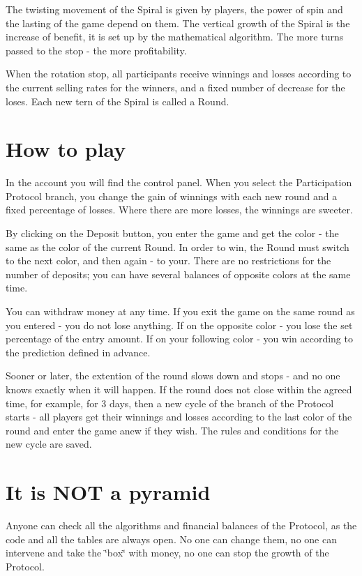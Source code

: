 

The twisting movement of the Spiral is given by players, the power of spin and the lasting of the game depend on them. The vertical growth of the Spiral is the increase of benefit, it is set up by the mathematical algorithm. The more turns passed to the stop -\/ the more profitability.

When the rotation stop, all participants receive winnings and losses according to the current selling rates for the winners, and a fixed number of decrease for the loses. Each new tern of the Spiral is called a Round.

 

\section*{How to play}

In the account you will find the control panel. When you select the Participation Protocol branch, you change the gain of winnings with each new round and a fixed percentage of losses. Where there are more losses, the winnings are sweeter.

By clicking on the Deposit button, you enter the game and get the color -\/ the same as the color of the current Round. In order to win, the Round must switch to the next color, and then again -\/ to your. There are no restrictions for the number of deposits; you can have several balances of opposite colors at the same time.

You can withdraw money at any time. If you exit the game on the same round as you entered -\/ you do not lose anything. If on the opposite color -\/ you lose the set percentage of the entry amount. If on your following color -\/ you win according to the prediction defined in advance.

Sooner or later, the extention of the round slows down and stops -\/ and no one knows exactly when it will happen. If the round does not close within the agreed time, for example, for 3 days, then a new cycle of the branch of the Protocol starts -\/ all players get their winnings and losses according to the last color of the round and enter the game anew if they wish. The rules and conditions for the new cycle are saved.

\section*{It is N\+OT a pyramid}

Anyone can check all the algorithms and financial balances of the Protocol, as the code and all the tables are always open. No one can change them, no one can intervene and take the \char`\"{}box\char`\"{} with money, no one can stop the growth of the Protocol.

